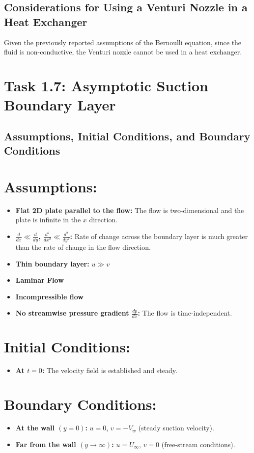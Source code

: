 \documentclass{article}
\begin{document}
\subsection{Considerations for Using a Venturi Nozzle in a Heat Exchanger}

Given the previously reported assumptions of the Bernoulli equation, since the fluid is non-conductive, the Venturi nozzle cannot be used in a heat exchanger.


\section{Task 1.7: Asymptotic Suction Boundary Layer}

\subsection{Assumptions, Initial Conditions, and Boundary Conditions}

\section*{Assumptions:}
\begin{itemize}
    \item \textbf{Flat 2D plate parallel to the flow:} The flow is two-dimensional and the plate is infinite in the \(x\) direction.
    \item \textbf{\(\frac{d}{dx} \ll \frac{d}{dy}\), \(\frac{d^2}{dx^2} \ll \frac{d^2}{dy^2}\):} Rate of change across the boundary layer is much greater than the rate of change in the flow direction.
    \item \textbf{Thin boundary layer:} \(u \gg v\)
    \item \textbf{Laminar Flow}
    \item \textbf{Incompressible flow}
    \item \textbf{No streamwise pressure gradient \(\frac{dp}{dx}\):} The flow is time-independent.
\end{itemize}

\section*{Initial Conditions:}
\begin{itemize}
    \item \textbf{At \(t = 0\):} The velocity field is established and steady.
\end{itemize}

\section*{Boundary Conditions:}
\begin{itemize}
    \item \textbf{At the wall \((y = 0)\):} \(u = 0\), \(v = -V_w\) (steady suction velocity).
    \item \textbf{Far from the wall \((y \rightarrow \infty)\):} \(u = U_\infty\), \(v = 0\) (free-stream conditions).
\end{itemize}
\end{document}
